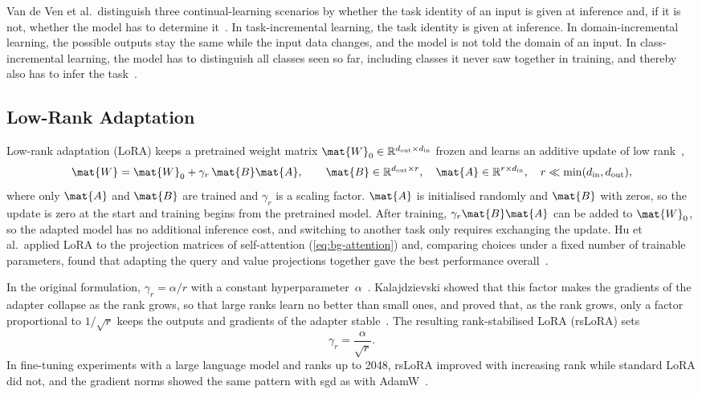 Van de Ven et al.\ distinguish three continual-learning scenarios by whether the task identity of an input is given at inference and, if it is not, whether the model has to determine it~\cite{van_de_Ven_2025}.
In task-incremental learning, the task identity is given at inference.
In domain-incremental learning, the possible outputs stay the same while the input data changes, and the model is not told the domain of an input.
In class-incremental learning, the model has to distinguish all classes seen so far, including classes it never saw together in training, and thereby also has to infer the task~\cite{van_de_Ven_2025}.

\subsection{Low-Rank Adaptation}
\label{subsec:bg-lora}

Low-rank adaptation (LoRA) keeps a pretrained weight matrix $\mat{W}_0 \in \mathbb{R}^{d_{\mathrm{out}} \times d_{\mathrm{in}}}$ frozen and learns an additive update of low rank~\cite[Sec.~4.1]{hu2022lora},
\begin{equation}
\mat{W} = \mat{W}_0 + \gamma_r \, \mat{B}\mat{A},
\qquad \mat{B} \in \mathbb{R}^{d_{\mathrm{out}} \times r}, \quad \mat{A} \in \mathbb{R}^{r \times d_{\mathrm{in}}}, \quad r \ll \min(d_{\mathrm{in}}, d_{\mathrm{out}}),
\label{eq:bg-lora}
\end{equation}
where only $\mat{A}$ and $\mat{B}$ are trained and $\gamma_r$ is a scaling factor.
$\mat{A}$ is initialised randomly and $\mat{B}$ with zeros, so the update is zero at the start and training begins from the pretrained model.
After training, $\gamma_r\mat{B}\mat{A}$ can be added to $\mat{W}_0$, so the adapted model has no additional inference cost, and switching to another task only requires exchanging the update.
Hu et al.\ applied LoRA to the projection matrices of self-attention (\cref{eq:bg-attention}) and, comparing choices under a fixed number of trainable parameters, found that adapting the query and value projections together gave the best performance overall~\cite[Sec.~4.2, 7.1, Table~5]{hu2022lora}.

In the original formulation, $\gamma_r = \alpha / r$ with a constant hyperparameter~$\alpha$~\cite[Sec.~4.1]{hu2022lora}.
Kalajdzievski showed that this factor makes the gradients of the adapter collapse as the rank grows, so that large ranks learn no better than small ones, and proved that, as the rank grows, only a factor proportional to $1/\sqrt{r}$ keeps the outputs and gradients of the adapter stable~\cite[Sec.~2.1, 3]{kalajdzievski2023rankstabilizationscalingfactor}.
The resulting rank-stabilised LoRA (rsLoRA) sets
\begin{equation}
\gamma_r = \frac{\alpha}{\sqrt{r}}.
\label{eq:bg-rslora}
\end{equation}
In fine-tuning experiments with a large language model and ranks up to 2048, rsLoRA improved with increasing rank while standard LoRA did not, and the gradient norms showed the same pattern with \gls{sgd} as with AdamW~\cite[Sec.~4]{kalajdzievski2023rankstabilizationscalingfactor}.

